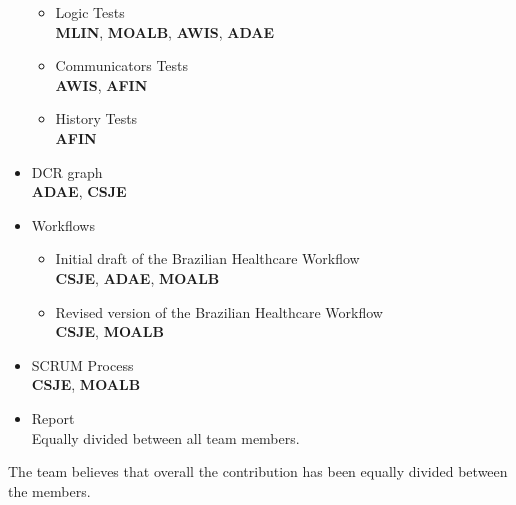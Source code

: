 \begin{itemize}
\begin{itemize}
		\item Logic Tests\\
		\textbf{MLIN}, \textbf{MOALB}, \textbf{AWIS}, \textbf{ADAE}
		\item Communicators Tests\\
		\textbf{AWIS}, \textbf{AFIN}
		\item History Tests\\
		\textbf{AFIN}
	\end{itemize}
	\item DCR graph\\
	\textbf{ADAE}, \textbf{CSJE}
	\item Workflows
	\begin{itemize}
		\item Initial draft of the Brazilian Healthcare Workflow\\
		\textbf{CSJE}, \textbf{ADAE}, \textbf{MOALB}
		\item Revised version of the Brazilian Healthcare Workflow\\
		\textbf{CSJE}, \textbf{MOALB}
	\end{itemize}
	\item SCRUM Process\\
	\textbf{CSJE}, \textbf{MOALB}
	\item Report\\
	Equally divided between all team members.
\end{itemize}

The team believes that overall the contribution has been equally divided between the members.